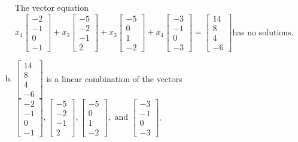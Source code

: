 \begin{exerciseAnswer}
\begin{enumerate}[(a)]
\begin{center}
\begin{minipage}{0.8\textwidth}
 The vector equation \( x_{1} \left[\begin{array}{c}
-2 \\
-1 \\
0 \\
-1
\end{array}\right] + x_{2} \left[\begin{array}{c}
-5 \\
-2 \\
-1 \\
2
\end{array}\right] + x_{3} \left[\begin{array}{c}
-5 \\
0 \\
1 \\
-2
\end{array}\right] + x_{4} \left[\begin{array}{c}
-3 \\
-1 \\
0 \\
-3
\end{array}\right] = \left[\begin{array}{c}
14 \\
8 \\
4 \\
-6
\end{array}\right] \)has no solutions.
\end{minipage}\end{center}
    
\item 

\( \left[\begin{array}{c}
14 \\
8 \\
4 \\
-6
\end{array}\right] \) is a linear combination of the vectors \( \left[\begin{array}{c}
-2 \\
-1 \\
0 \\
-1
\end{array}\right] , \left[\begin{array}{c}
-5 \\
-2 \\
-1 \\
2
\end{array}\right] , \left[\begin{array}{c}
-5 \\
0 \\
1 \\
-2
\end{array}\right] , \text{ and } \left[\begin{array}{c}
-3 \\
-1 \\
0 \\
-3
\end{array}\right] \). 


\end{enumerate}
    
\end{exerciseAnswer}
    
